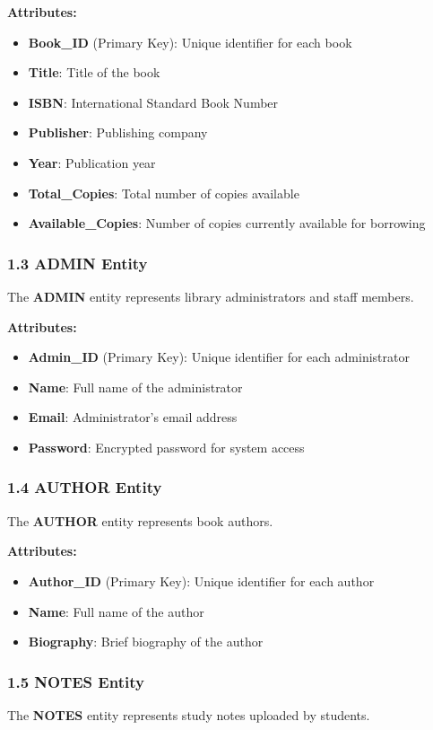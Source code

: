\documentclass[12pt,a4paper]{article}
\begin{document}
\textbf{Attributes:}
\begin{itemize}
    \item \textbf{Book\_ID} (Primary Key): Unique identifier for each book
    \item \textbf{Title}: Title of the book
    \item \textbf{ISBN}: International Standard Book Number
    \item \textbf{Publisher}: Publishing company
    \item \textbf{Year}: Publication year
    \item \textbf{Total\_Copies}: Total number of copies available
    \item \textbf{Available\_Copies}: Number of copies currently available for borrowing
\end{itemize}

\subsubsection{1.3 ADMIN Entity}
The \textbf{ADMIN} entity represents library administrators and staff members.

\textbf{Attributes:}
\begin{itemize}
    \item \textbf{Admin\_ID} (Primary Key): Unique identifier for each administrator
    \item \textbf{Name}: Full name of the administrator
    \item \textbf{Email}: Administrator's email address
    \item \textbf{Password}: Encrypted password for system access
\end{itemize}

\subsubsection{1.4 AUTHOR Entity}
The \textbf{AUTHOR} entity represents book authors.

\textbf{Attributes:}
\begin{itemize}
    \item \textbf{Author\_ID} (Primary Key): Unique identifier for each author
    \item \textbf{Name}: Full name of the author
    \item \textbf{Biography}: Brief biography of the author
\end{itemize}

\subsubsection{1.5 NOTES Entity}
The \textbf{NOTES} entity represents study notes uploaded by students.
\end{document}
